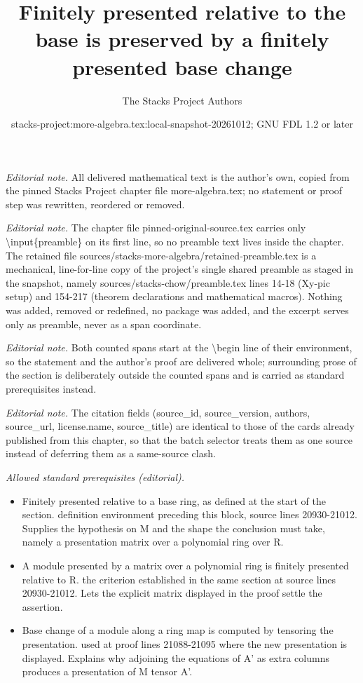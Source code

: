 \documentclass[10pt,a4paper]{amsart}
\title{Finitely presented relative to the base is preserved by a finitely presented base change}
\author{The Stacks Project Authors}
\date{stacks-project:more-algebra.tex:local-snapshot-20261012; GNU FDL 1.2 or later}
\theoremstyle{plain}
\theoremstyle{definition}
\theoremstyle{remark}
\numberwithin{equation}{subsection}
\begin{document}
\maketitle
\setcounter{subsection}{1}
\noindent\textit{Editorial note.} All delivered mathematical text is the author's own, copied from the pinned Stacks Project chapter file more-algebra.tex; no statement or proof step was rewritten, reordered or removed.\par\medskip
\noindent\textit{Editorial note.} The chapter file pinned-original-source.tex carries only \textbackslash{}input\{preamble\} on its first line, so no preamble text lives inside the chapter. The retained file sources/stacks-more-algebra/retained-preamble.tex is a mechanical, line-for-line copy of the project's single shared preamble as staged in the snapshot, namely sources/stacks-chow/preamble.tex lines 14-18 (Xy-pic setup) and 154-217 (theorem declarations and mathematical macros). Nothing was added, removed or redefined, no package was added, and the excerpt serves only as preamble, never as a span coordinate.\par\medskip
\noindent\textit{Editorial note.} Both counted spans start at the \textbackslash{}begin line of their environment, so the statement and the author's proof are delivered whole; surrounding prose of the section is deliberately outside the counted spans and is carried as standard prerequisites instead.\par\medskip
\noindent\textit{Editorial note.} The citation fields (source\_id, source\_version, authors, source\_url, license.name, source\_title) are identical to those of the cards already published from this chapter, so that the batch selector treats them as one source instead of deferring them as a same-source clash.\par\medskip
\noindent\textit{Allowed standard prerequisites (editorial).}\begin{itemize}
\item Finitely presented relative to a base ring, as defined at the start of the section. definition environment preceding this block, source lines 20930-21012. Supplies the hypothesis on M and the shape the conclusion must take, namely a presentation matrix over a polynomial ring over R.
\item A module presented by a matrix over a polynomial ring is finitely presented relative to R. the criterion established in the same section at source lines 20930-21012. Lets the explicit matrix displayed in the proof settle the assertion.
\item Base change of a module along a ring map is computed by tensoring the presentation. used at proof lines 21088-21095 where the new presentation is displayed. Explains why adjoining the equations of A' as extra columns produces a presentation of M tensor A'.
\end{itemize}\medskip
\end{document}
